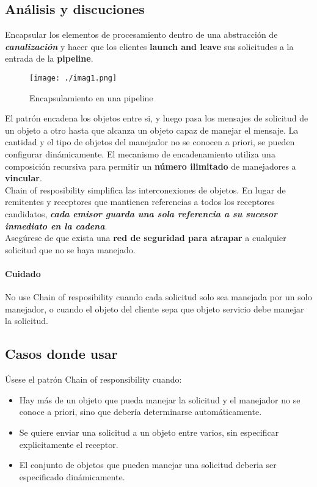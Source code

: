 \documentclass[a4paper,10pt]{article}
\begin{document}
\subsection{An\'alisis y discuciones}
Encapsular los elementos de procesamiento dentro de una abstracci\'on de \textbf{\emph{canalizaci\'on}} y hacer que los clientes \textbf{launch and leave} sus solicitudes a la entrada de la \textbf{pipeline}. \\
\begin{figure}[!h]
 \centering
 \texttt{[image: ./imag1.png]}
 \caption{Encapsulamiento en una pipeline}
 \label{fig:1}
\end{figure}

El patr\'on encadena los objetos entre si, y luego pasa los mensajes de solicitud de un objeto a otro hasta que alcanza un objeto capaz de manejar el mensaje. La cantidad y el tipo de objetos del manejador no se conocen a priori, se pueden configurar din\'amicamente. El mecanismo de encadenamiento utiliza una composici\'on recursiva para permitir un \textbf{n\'umero ilimitado} de manejadores a \textbf{vincular}. \\

Chain of resposibility simplifica las interconexiones de objetos. En lugar de remitentes y receptores que mantienen referencias a todos los receptores candidatos, \textbf{\emph{cada emisor guarda una sola referencia a su sucesor inmediato en la cadena}}. \\

Aseg\'urese de que exista una \textbf{red de seguridad para atrapar} a cualquier solicitud que no se haya manejado.
\paragraph{Cuidado}
No use Chain of resposibility cuando cada solicitud solo sea manejada por un solo manejador, o cuando el objeto del cliente sepa que objeto servicio debe manejar la solicitud.

\subsection{Casos donde usar}
\'Usese el patr\'on Chain of responsibility cuando:
\begin{itemize}
 \item Hay m\'as de un objeto que pueda manejar la solicitud y el manejador no se conoce a priori, sino que deber\'ia determinarse autom\'aticamente.
 \item Se quiere enviar una solicitud a un objeto entre varios, sin especificar explicitamente el receptor.
 \item El conjunto de objetos que pueden manejar una solicitud deberia ser especificado din\'amicamente.
\end{itemize}
\end{document}
